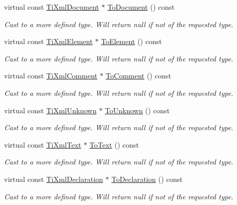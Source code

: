 \begin{DoxyCompactItemize}
virtual const \hyperlink{class_ti_xml_document}{Ti\+Xml\+Document} $\ast$ \hyperlink{class_ti_xml_node_a8a4cda4b15c29f64cff419309aebed08}{To\+Document} () const 
\begin{DoxyCompactList}\small\item\em Cast to a more defined type. Will return null if not of the requested type. \end{DoxyCompactList}\item 
virtual const \hyperlink{class_ti_xml_element}{Ti\+Xml\+Element} $\ast$ \hyperlink{class_ti_xml_node_a72abed96dc9667ab9e0a2a275301bb1c}{To\+Element} () const 
\begin{DoxyCompactList}\small\item\em Cast to a more defined type. Will return null if not of the requested type. \end{DoxyCompactList}\item 
virtual const \hyperlink{class_ti_xml_comment}{Ti\+Xml\+Comment} $\ast$ \hyperlink{class_ti_xml_node_aa0a5086f9eaee910bbfdc7f975e26574}{To\+Comment} () const 
\begin{DoxyCompactList}\small\item\em Cast to a more defined type. Will return null if not of the requested type. \end{DoxyCompactList}\item 
virtual const \hyperlink{class_ti_xml_unknown}{Ti\+Xml\+Unknown} $\ast$ \hyperlink{class_ti_xml_node_afd7205cf31d7a376929f8a36930627a2}{To\+Unknown} () const 
\begin{DoxyCompactList}\small\item\em Cast to a more defined type. Will return null if not of the requested type. \end{DoxyCompactList}\item 
virtual const \hyperlink{class_ti_xml_text}{Ti\+Xml\+Text} $\ast$ \hyperlink{class_ti_xml_node_a95a46a52c525992d6b4ee08beb14cd69}{To\+Text} () const 
\begin{DoxyCompactList}\small\item\em Cast to a more defined type. Will return null if not of the requested type. \end{DoxyCompactList}\item 
virtual const \hyperlink{class_ti_xml_declaration}{Ti\+Xml\+Declaration} $\ast$ \hyperlink{class_ti_xml_node_a9f43e6984fc7d4afd6eb32714c6b7b72}{To\+Declaration} () const 
\begin{DoxyCompactList}\small\item\em Cast to a more defined type. Will return null if not of the requested type. \end{DoxyCompactList}\item 

\end{DoxyCompactItemize}
